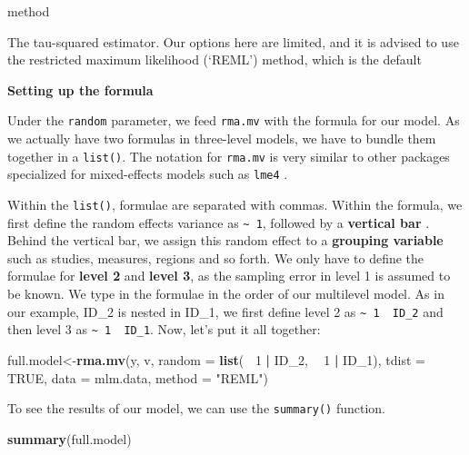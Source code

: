 \documentclass[]{book}
\newenvironment{Shaded}{\begin{snugshade}}{\end{snugshade}}
\newcommand{\DataTypeTok}[1]{\textcolor[rgb]{0.13,0.29,0.53}{#1}}
\newcommand{\DecValTok}[1]{\textcolor[rgb]{0.00,0.00,0.81}{#1}}
\newcommand{\KeywordTok}[1]{\textcolor[rgb]{0.13,0.29,0.53}{\textbf{#1}}}
\newcommand{\NormalTok}[1]{#1}
\newcommand{\OperatorTok}[1]{\textcolor[rgb]{0.81,0.36,0.00}{\textbf{#1}}}
\newcommand{\OtherTok}[1]{\textcolor[rgb]{0.56,0.35,0.01}{#1}}
\newcommand{\StringTok}[1]{\textcolor[rgb]{0.31,0.60,0.02}{#1}}
\begin{document}
method

The tau-squared estimator. Our options here are limited, and it is advised to use the restricted maximum likelihood (`REML') method, which is the default

\textbf{Setting up the formula}

Under the \texttt{random} parameter, we feed \texttt{rma.mv} with the formula for our model. As we actually have two formulas in three-level models, we have to bundle them together in a \texttt{list()}. The notation for \texttt{rma.mv} is very similar to other packages specialized for mixed-effects models such as \texttt{lme4} \citep{lme4}.

Within the \texttt{list()}, formulae are separated with commas. Within the formula, we first define the random effects variance as \texttt{\textasciitilde{}\ 1}, followed by a \textbf{vertical bar} \texttt{\textbar{}}. Behind the vertical bar, we assign this random effect to a \textbf{grouping variable} such as studies, measures, regions and so forth. We only have to define the formulae for \textbf{level 2} and \textbf{level 3}, as the sampling error in level 1 is assumed to be known. We type in the formulae in the order of our multilevel model. As in our example, ID\_2 is nested in ID\_1, we first define level 2 as \texttt{\textasciitilde{}\ 1\ \textbar{}\ ID\_2} and then level 3 as \texttt{\textasciitilde{}\ 1\ \textbar{}\ ID\_1}. Now, let's put it all together:

\begin{Shaded}
\begin{Highlighting}[]
\NormalTok{full.model<-}\KeywordTok{rma.mv}\NormalTok{(y, }
\NormalTok{                   v, }
                   \DataTypeTok{random =} \KeywordTok{list}\NormalTok{(}\OperatorTok{~}\StringTok{ }\DecValTok{1} \OperatorTok{|}\StringTok{ }\NormalTok{ID_}\DecValTok{2}\NormalTok{, }
                                 \OperatorTok{~}\StringTok{ }\DecValTok{1} \OperatorTok{|}\StringTok{ }\NormalTok{ID_}\DecValTok{1}\NormalTok{), }
                   \DataTypeTok{tdist =} \OtherTok{TRUE}\NormalTok{, }
                   \DataTypeTok{data =}\NormalTok{ mlm.data,}
                   \DataTypeTok{method =} \StringTok{"REML"}\NormalTok{)}
\end{Highlighting}
\end{Shaded}

To see the results of our model, we can use the \texttt{summary()} function.

\begin{Shaded}
\begin{Highlighting}[]
\KeywordTok{summary}\NormalTok{(full.model)}
\end{Highlighting}
\end{Shaded}
\end{document}
